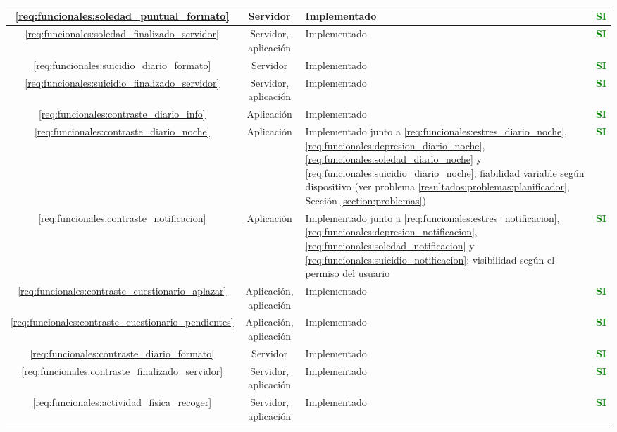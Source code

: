 \begin{xltabular}{\textwidth}{|c|c|X|c|}
        \hline
        \ref{req:funcionales:soledad_puntual_formato} & Servidor & Implementado & \textcolor{green}{\textbf{SI}} \\
        \hline
        \ref{req:funcionales:soledad_finalizado_servidor} & Servidor, aplicación & Implementado & \textcolor{green}{\textbf{SI}} \\
        \hline
        \ref{req:funcionales:suicidio_diario_formato} & Servidor & Implementado & \textcolor{green}{\textbf{SI}} \\
        \hline
        \ref{req:funcionales:suicidio_finalizado_servidor} & Servidor, aplicación & Implementado & \textcolor{green}{\textbf{SI}} \\
        \hline
        \ref{req:funcionales:contraste_diario_info} & Aplicación & Implementado & \textcolor{green}{\textbf{SI}} \\
        \hline
        \ref{req:funcionales:contraste_diario_noche} & Aplicación & Implementado junto a \ref{req:funcionales:estres_diario_noche},
        \ref{req:funcionales:depresion_diario_noche}, \ref{req:funcionales:soledad_diario_noche} y   \ref{req:funcionales:suicidio_diario_noche}; fiabilidad variable según dispositivo (ver problema \ref{resultados:problemas:planificador}, Sección \ref{section:problemas}) & \textcolor{green}{\textbf{SI}} \\
        \hline
        \ref{req:funcionales:contraste_notificacion} & Aplicación & Implementado junto a \ref{req:funcionales:estres_notificacion}, \ref{req:funcionales:depresion_notificacion}, \ref{req:funcionales:soledad_notificacion} y \ref{req:funcionales:suicidio_notificacion}; visibilidad según el permiso del usuario & \textcolor{green}{\textbf{SI}} \\
        \hline
        \ref{req:funcionales:contraste_cuestionario_aplazar} & Aplicación, aplicación & Implementado & \textcolor{green}{\textbf{SI}} \\
        \hline
        \ref{req:funcionales:contraste_cuestionario_pendientes} & Aplicación, aplicación & Implementado & \textcolor{green}{\textbf{SI}} \\
        \hline
        \ref{req:funcionales:contraste_diario_formato} & Servidor & Implementado & \textcolor{green}{\textbf{SI}} \\
        \hline
        \ref{req:funcionales:contraste_finalizado_servidor} & Servidor, aplicación & Implementado & \textcolor{green}{\textbf{SI}} \\
        \hline
        \ref{req:funcionales:actividad_fisica_recoger} & Servidor, aplicación & Implementado & \textcolor{green}{\textbf{SI}} \\

\end{xltabular}
